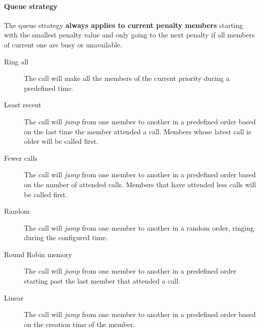\documentclass[letterpaper,10pt,english]{sphinxmanual}
\begin{document}
\paragraph{Queue strategy}
\label{administration_portal/client/vpbx/routing_endpoints/queues:queue-strategy}
The queue strategy \textbf{always applies to current penalty members} starting with
the smallest penalty value and only going to the next penalty if all members of
current one are busy or unavailable.
\begin{description}
\item[{Ring all}] \leavevmode{}\label{administration_portal/client/vpbx/routing_endpoints/queues:term-ring-all}
The call will make all the members of the current priority during a
predefined time.

\item[{Least recent}] \leavevmode{}\label{administration_portal/client/vpbx/routing_endpoints/queues:term-least-recent}
The call will \emph{jump} from one member to another in a predefined order
based on the last time the member attended a call. Members whose latest
call is older will be called first.

\item[{Fewer calls}] \leavevmode{}\label{administration_portal/client/vpbx/routing_endpoints/queues:term-fewer-calls}
The call will \emph{jump} from one member to another in a predefined order
based on the number of attended calls. Members that have attended less
calls will be called first.

\item[{Random}] \leavevmode{}\label{administration_portal/client/vpbx/routing_endpoints/queues:term-random}
The call will \emph{jump} from one member to another in a random order,
ringing during the configured time.

\item[{Round Robin memory}] \leavevmode{}\label{administration_portal/client/vpbx/routing_endpoints/queues:term-round-robin-memory}
The call will \emph{jump} from one member to another in a predefined order
starting past the last member that attended a call.

\item[{Linear}] \leavevmode{}\label{administration_portal/client/vpbx/routing_endpoints/queues:term-linear}
The call will \emph{jump} from one member to another in a predefined order
based on the creation time of the member.

\end{description}
\end{document}

